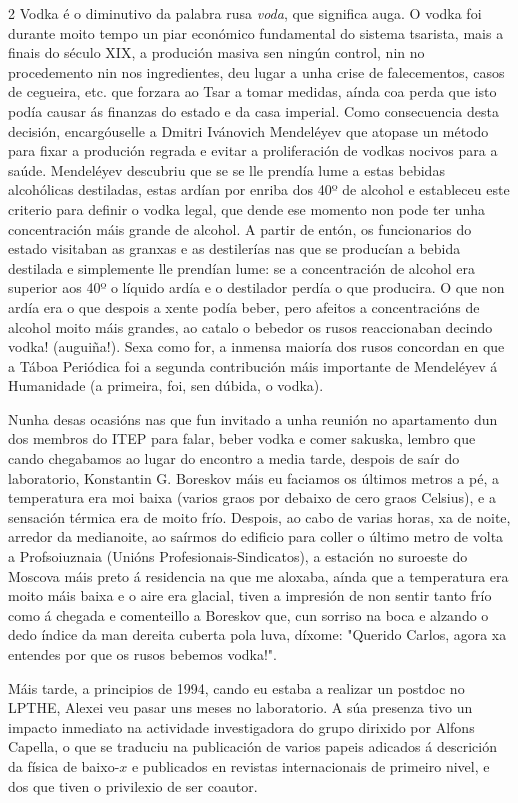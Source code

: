 \begin{refsection}
\begin{multicols}{2}
Vodka é o diminutivo da palabra rusa \textit{voda}, que significa auga. O vodka
foi durante moito tempo un piar económico fundamental do sistema tsarista, mais
a finais do século XIX, a produción masiva sen ningún control, nin no
procedemento nin nos ingredientes, deu lugar a unha crise de falecementos,
casos de cegueira, etc. que forzara ao Tsar a tomar medidas, aínda coa perda
que isto podía causar ás finanzas do estado e da casa imperial. Como
consecuencia desta decisión, encargóuselle a Dmitri Ivánovich Mendeléyev que
atopase un método para fixar a produción regrada e evitar a proliferación de
vodkas nocivos para a saúde. Mendeléyev descubriu que se se lle prendía lume a
estas bebidas alcohólicas destiladas, estas ardían por enriba dos 40º de
alcohol e estableceu este criterio para definir o vodka legal, que dende ese
momento non pode ter unha concentración máis grande de alcohol. A partir de
entón, os funcionarios do estado visitaban as granxas e as destilerías nas que
se producían a bebida destilada e simplemente lle prendían lume: se a
concentración de alcohol era superior aos 40º o líquido ardía e o destilador
perdía o que producira. O que non ardía era o que despois a xente podía beber,
pero afeitos a concentracións de alcohol moito máis grandes, ao catalo o
bebedor os rusos reaccionaban decindo vodka! (auguiña!). Sexa como for, a
inmensa maioría dos rusos concordan en que a Táboa Periódica foi a segunda
contribución máis importante de Mendeléyev á Humanidade (a primeira, foi, sen
dúbida, o vodka).

Nunha desas ocasións nas que fun invitado a unha reunión no apartamento dun dos
membros do ITEP para falar, beber vodka e comer sakuska, lembro que cando
chegabamos ao lugar do encontro a media tarde, despois de saír do laboratorio,
Konstantin G. Boreskov máis eu faciamos os últimos metros a pé, a temperatura
era moi baixa (varios graos por debaixo de cero graos Celsius), e a sensación
térmica era de moito frío. Despois, ao cabo de varias horas, xa de noite,
arredor da medianoite, ao saírmos do edificio para coller o último metro de
volta a Profsoiuznaia (Unións Profesionais-Sindicatos), a estación no suroeste
do Moscova máis preto á residencia na que me aloxaba, aínda que a temperatura
era moito máis baixa e o aire era glacial, tiven a impresión de non sentir
tanto frío como á chegada e comenteillo a Boreskov que, cun sorriso na boca e
alzando o dedo índice da man dereita cuberta pola luva, díxome: "Querido
Carlos, agora xa entendes por que os rusos bebemos vodka!".

Máis tarde, a principios de 1994, cando eu estaba a realizar un postdoc no
LPTHE, Alexei veu pasar uns meses no laboratorio. A súa presenza tivo un
impacto inmediato na actividade investigadora do grupo dirixido por Alfons
Capella, o que se traduciu na publicación de varios papeis adicados á
descrición da física de baixo-$x$ e publicados en revistas internacionais de
primeiro nivel, e dos que tiven o privilexio de ser coautor.


\end{multicols}
\end{refsection}
